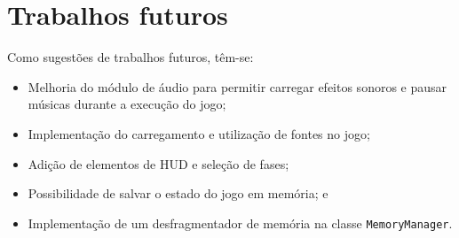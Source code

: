 \chapter[Trabalhos futuros]{Trabalhos futuros}

Como sugestões de trabalhos futuros, têm-se:

\begin{itemize}
  \item Melhoria do módulo de áudio para permitir carregar efeitos sonoros e pausar músicas durante a execução do jogo;
  \item Implementação do carregamento e utilização de fontes no jogo;
  \item Adição de elementos de HUD e seleção de fases;
  \item Possibilidade de salvar o estado do jogo em memória; e
  \item Implementação de um desfragmentador de memória na classe \texttt{MemoryManager}.
\end{itemize}